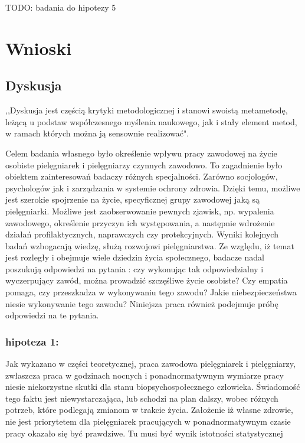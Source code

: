 \documentclass[a4paper,12pt,twoside,openany]{report}
\begin{document}
\vspace{\baselineskip} 

TODO: badania do hipotezy 5

\vspace{\baselineskip} 


\chapter{Wnioski}


\section{Dyskusja}
,,Dyskusja jest częścią krytyki metodologicznej i stanowi swoistą metametodę, leżącą u podstaw współczesnego myślenia naukowego, jak i stały element metod, w ramach których można ją sensownie realizować"\cite{krytyka}.


Celem badania własnego było określenie wpływu pracy zawodowej na życie osobiste pielęgniarek i pielęgniarzy czynnych zawodowo. To zagadnienie było obiektem zainteresowań badaczy różnych specjalności. Zarówno socjologów, psychologów jak i zarządzania w systemie ochrony zdrowia.  Dzięki temu, możliwe jest szerokie spojrzenie na życie, specyficznej grupy zawodowej jaką są pielęgniarki. Możliwe jest zaobserwowanie pewnych zjawisk, np. wypalenia zawodowego, określenie przyczyn ich występowania, a następnie wdrożenie działań profilaktycznych, naprawczych czy protekcyjnych. Wyniki kolejnych badań wzbogacają wiedzę, służą rozwojowi pielęgniarstwa. Ze względu, iż temat jest rozległy i obejmuje wiele dziedzin życia społecznego, badacze nadal poszukują odpowiedzi na pytania : czy wykonując tak odpowiedzialny i wyczerpujący zawód, można prowadzić szczęśliwe życie osobiste? Czy empatia pomaga, czy przeszkadza w wykonywaniu tego zawodu? Jakie niebezpieczeństwa niesie wykonywanie tego zawodu? Niniejsza praca również podejmuje próbę odpowiedzi na te pytania.

\subsection{hipoteza 1:}

Jak wykazano w części teoretycznej, praca zawodowa pielęgniarek i pielęgniarzy, zwłaszcza praca w godzinach nocnych i ponadnormatywnym wymiarze pracy niesie niekorzystne skutki dla stanu biopsychospołecznego człowieka. Świadomość tego faktu jest niewystarczająca, lub schodzi na plan dalszy, wobec różnych potrzeb, które podlegają zmianom w trakcie życia. Założenie iż własne zdrowie, nie jest priorytetem dla pielęgniarek pracujących w ponadnormatywnym czasie pracy okazało się być prawdziwe. Tu musi być wynik istotności statystycznej
\end{document}

